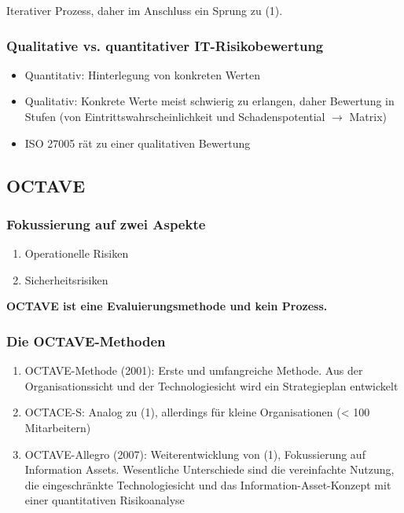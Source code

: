 Iterativer Prozess, daher im Anschluss ein Sprung zu (1).

\subsubsection{Qualitative vs. quantitativer IT-Risikobewertung}
\begin{itemize}
	\item Quantitativ: Hinterlegung von konkreten Werten
	\item Qualitativ: Konkrete Werte meist schwierig zu erlangen, daher Bewertung in Stufen (von Eintrittswahrscheinlichkeit und Schadenspotential $\rightarrow$ Matrix)
	\item ISO 27005 rät zu einer qualitativen Bewertung
\end{itemize}


\subsection{OCTAVE}

\subsubsection{Fokussierung auf zwei Aspekte}
\begin{enumerate}
	\item Operationelle Risiken
	\item Sicherheitsrisiken
\end{enumerate}

\textbf{OCTAVE ist eine Evaluierungsmethode und kein Prozess.}

\subsubsection{Die OCTAVE-Methoden}
\begin{enumerate}
	\item OCTAVE-Methode (2001): Erste und umfangreiche Methode. Aus der Organisationssicht und der Technologiesicht wird ein Strategieplan entwickelt
	\item OCTACE-S: Analog zu (1), allerdings für kleine Organisationen (< 100 Mitarbeitern)
	\item OCTAVE-Allegro (2007): Weiterentwicklung von (1), Fokussierung auf Information Assets. Wesentliche Unterschiede sind die vereinfachte Nutzung, die eingeschränkte Technologiesicht und das Information-Asset-Konzept mit einer quantitativen Risikoanalyse
\end{enumerate}

